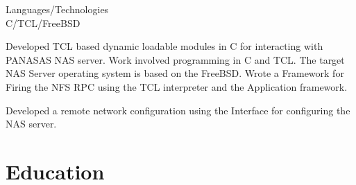\documentclass[a4,10pt]{cv4tw}
\begin{document}
{Languages/Technologies \\ C/TCL/FreeBSD}
	{ 
	\begin{missions}		
		\item Developed TCL based dynamic loadable modules in C for interacting with PANASAS NAS server. Work involved programming in C and TCL. The target NAS Server operating system is based on the FreeBSD. Wrote a Framework for Firing the NFS RPC using the TCL interpreter and the Application framework.
		\item Developed a remote network configuration using the  Interface for configuring the NAS server.    
	\end{missions}	
}	


\section{Education}

\end{document}
